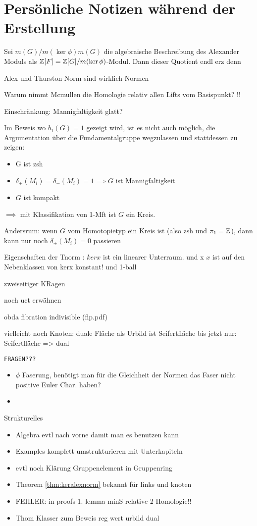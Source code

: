 
\section{Persönliche Notizen während der Erstellung}
	Sei $m(G)/m(\ker \phi)m(G)$ die algebraische Beschreibung des Alexander Moduls als $\mathbb{Z}[F]=\mathbb{Z}[G]/m(\ker \phi)$-Modul. Dann dieser Quotient endl erz denn

	Alex und Thurston Norm sind wirklich Normen 

	Warum nimmt Mcmullen die Homologie relativ allen Lifts vom Basispunkt?  !!

	Einschränkung: Mannigfaltigkeit glatt?

	Im Beweis wo $b_1(G)=1$ gezeigt wird, ist es nicht auch möglich, die Argumentation über die Fundamentalgruppe wegzulassen und stattdessen zu zeigen:
	\begin{itemize}
		\item G ist zsh
		\item $\delta_+(M_i) = \delta_-(M_i)=1 \implies G$ ist Mannigfaltigkeit
		\item $G$ ist kompakt
	\end{itemize}
	$\implies$ mit Klassifikation von 1-Mft ist $G$ ein Kreis.

	Andersrum: wenn $G$ vom Homotopietyp ein Kreis ist (also zsh und $\pi_1=\mathbb{Z}$), dann kann nur noch $\delta_\pm(M_i)=0$ passieren

	Eigenschaften der Tnorm : $kerx$ ist ein linearer Unterraum. und x $x$ ist auf den Nebenklassen von kerx konstant! und 1-ball

	zweiseitiger KRagen

	noch uct erwähnen

	obda fibration indivisible (flp.pdf)


	vielleicht noch Knoten: duale Fläche als Urbild ist Seifertfläche
	bis jetzt nur: Seifertfläche => dual

\texttt{FRAGEN???}
	\begin{itemize}
		\item $\phi$ Faserung, benötigt man für die Gleichheit der Normen das Faser nicht positive Euler Char. haben?
		\item 
	\end{itemize}

	{Strukturelles}
	\begin{itemize}
		\item Algebra evtl nach vorne damit man es benutzen kann
		\item Examples komplett umstrukturieren mit Unterkapiteln
		\item evtl noch Klärung Gruppenelement in Gruppenring
		\item Theorem \ref{thm:keralexnorm} bekannt für links und knoten
		\item FEHLER: in proofs 1. lemma minS relative 2-Homologie!!
		\item Thom Klasser zum Beweis reg wert urbild dual
	\end{itemize}